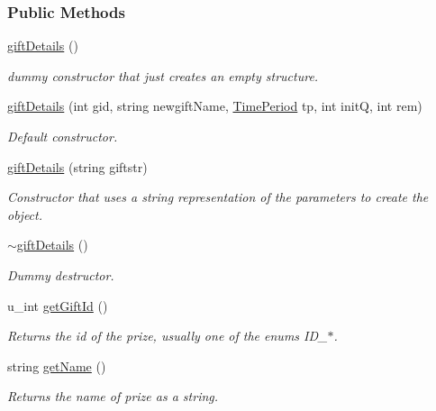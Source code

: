 \subsubsection*{Public Methods}
\begin{CompactItemize}
\item 
\hyperlink{classgiftDetails_giftDetailsa0}{gift\-Details} ()
\begin{CompactList}\small\item\em dummy constructor that just creates an empty structure.\item\end{CompactList}\item 
\hyperlink{classgiftDetails_giftDetailsa1}{gift\-Details} (int gid, string newgift\-Name, \hyperlink{classTimePeriod}{Time\-Period} tp, int init\-Q, int rem)
\begin{CompactList}\small\item\em Default constructor.\item\end{CompactList}\item 
\hyperlink{classgiftDetails_giftDetailsa2}{gift\-Details} (string giftstr)
\begin{CompactList}\small\item\em Constructor that uses a string representation of the parameters to create the object.\item\end{CompactList}\item 
\hyperlink{classgiftDetails_giftDetailsa3}{$\sim$gift\-Details} ()
\begin{CompactList}\small\item\em Dummy destructor.\item\end{CompactList}\item 
u\_\-int \hyperlink{classgiftDetails_giftDetailsa4}{get\-Gift\-Id} ()
\begin{CompactList}\small\item\em Returns the id of the prize, usually one of the enums ID\_\-$\ast$.\item\end{CompactList}\item 
string \hyperlink{classgiftDetails_giftDetailsa5}{get\-Name} ()
\begin{CompactList}\small\item\em Returns the name of prize as a string.\item\end{CompactList}\item 

\end{CompactItemize}
